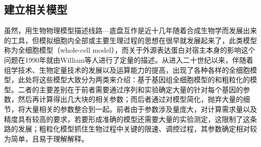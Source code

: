 \documentclass[b5paper,11pt,onecolumn,twoside,UTF8]{article}
\begin{document}
\subsection{建立相关模型}
\indent 虽然，用生物物理模型描述线路---底盘互作是近十几年随着合成生物学而发展出来的工具，但模拟细胞内全部或主要生理过程的思想在很早就发展起来了，此类模型称为全细胞模型（whole-cell model）\cite{carrera2015build}，而关于外源表达蛋白对宿主本身的影响这个问题在1990年就由William等人进行了定量的描述\cite{bentley1990}。从进入二十世纪以来，伴随着组学技术、生物定量技术的发展以及运算能力的提高，出现了各种各样的全细胞模型，此处将这些模型大致分为两类来介绍：基于基因组全细胞模型\cite{karr2012whole}的和粗粒化的模型\cite{Scott2010,10.1073/pnas.1416533112,Liao:2017b4f}。二者的主要差别在于前者需要通过序列和实验确定大量的针对每个基因的参数，然后再计算得出几大块的相关参数；而后者通过对模型简化，抛弃大量的细节，将大量相关的参数整合到一起。前者由于参数涉及量庞大，对计算需求量以及精度具有较高的要求，若要形成准确的模型还需要大量的实验测定，这限制了这条路的发展；粗粒化模型抓住生物过程中关键的限速、调控过程，其参数确定相对较为简单，且易于理解解释。%
\end{document}
